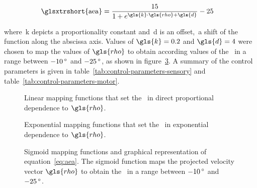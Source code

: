     \begin{align}
        \text{\glsxtrshort{aea}} &= \frac{15}{1 + e^{\gls{k} \cdot \gls{rho} + \gls{d}}} - 25
        \label{eq:aea}%
    \end{align}

    where~\gls{k} depicts a proportionality constant and~\gls{d} is an offset,~\ie a shift of the function along the abscissa axis. Values of$~\gls{k} = 0.2$ and$~\gls{d} = 4$ were chosen to map the values of$~\gls{rho}$ to obtain according values of the~ in a range between $-10\,\textrm{\si{\degree}}$ and $-25\,\textrm{\si{\degree}}$, as shown in figure~\ref{fig:sigmoid-mapping}. A summary of the control parameters is given in table~\ref{tab:control-parameters-sensory} and table~\ref{tab:control-parameters-motor}.
    
    \begin{figure}[htb]%
        \centering%
        
        \caption{Linear mapping functions that set the~ in direct proportional dependence to$~\gls{rho}$.}
        \label{fig:linear-mapping}
    \end{figure}%
    
    \begin{figure}[htb]%
        \centering%
        
        \caption{Exponential mapping functions that set the~ in exponential dependence to$~\gls{rho}$.}
        \label{fig:exponential-mapping}
    \end{figure}%
    
    \begin{figure}[H]%
        \centering%
        
        \caption{Sigmoid mapping functions and graphical representation of equation~\ref{eq:aea}. The sigmoid function maps the projected velocity vector$~\gls{rho}$ to obtain the~ in a range between $-10\,\textrm{\si{\degree}}$ and $-25\,\textrm{\si{\degree}}$.}
        \label{fig:sigmoid-mapping}
    \end{figure}%


